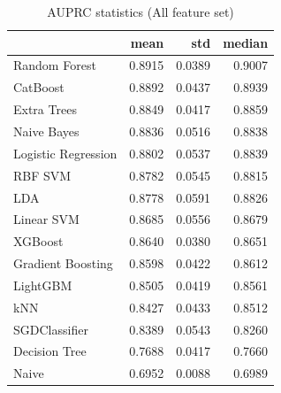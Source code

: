 \begin{table}
\caption{AUPRC statistics (All feature set)}
\label{tab:auprc_All_stats}
\begin{tabular}{lrrr}
\toprule
 & mean & std & median \\
\midrule
Random Forest & 0.8915 & 0.0389 & 0.9007 \\
CatBoost & 0.8892 & 0.0437 & 0.8939 \\
Extra Trees & 0.8849 & 0.0417 & 0.8859 \\
Naive Bayes & 0.8836 & 0.0516 & 0.8838 \\
Logistic Regression & 0.8802 & 0.0537 & 0.8839 \\
RBF SVM & 0.8782 & 0.0545 & 0.8815 \\
LDA & 0.8778 & 0.0591 & 0.8826 \\
Linear SVM & 0.8685 & 0.0556 & 0.8679 \\
XGBoost & 0.8640 & 0.0380 & 0.8651 \\
Gradient Boosting & 0.8598 & 0.0422 & 0.8612 \\
LightGBM & 0.8505 & 0.0419 & 0.8561 \\
kNN & 0.8427 & 0.0433 & 0.8512 \\
SGDClassifier & 0.8389 & 0.0543 & 0.8260 \\
Decision Tree & 0.7688 & 0.0417 & 0.7660 \\
Naive & 0.6952 & 0.0088 & 0.6989 \\
\bottomrule
\end{tabular}
\end{table}
